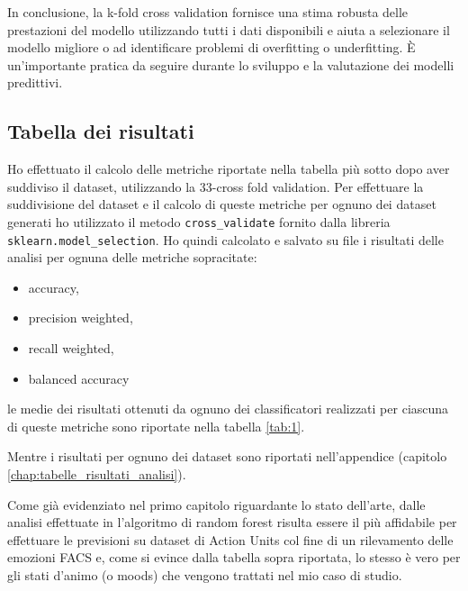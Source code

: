 In conclusione, la k-fold cross validation fornisce una stima robusta delle prestazioni del modello utilizzando tutti i dati disponibili e aiuta a selezionare il modello migliore o ad identificare problemi di overfitting o underfitting. È un'importante pratica da seguire durante lo sviluppo e la valutazione dei modelli predittivi.


\subsection{Tabella dei risultati}
Ho effettuato il calcolo delle metriche riportate nella tabella più sotto dopo aver suddiviso il dataset, utilizzando la 33-cross fold validation.
Per effettuare la suddivisione del dataset e il calcolo di queste metriche per ognuno dei dataset generati ho utilizzato il metodo \texttt{cross_validate} fornito dalla libreria \texttt{sklearn.model_selection}.
Ho quindi calcolato e salvato su file i risultati delle analisi per ognuna delle metriche sopracitate:
\begin{itemize}
    \item accuracy,
    \item precision weighted,
    \item recall weighted, 
    \item balanced accuracy
\end{itemize}
le medie dei risultati ottenuti da ognuno dei classificatori realizzati per ciascuna di queste metriche sono riportate nella tabella \ref{tab:1}.

Mentre i risultati per ognuno dei dataset sono riportati nell'appendice (capitolo \ref{chap:tabelle_risultati_analisi}).

Come già evidenziato nel primo capitolo riguardante lo stato dell’arte, dalle analisi effettuate in \cite{FaceExpreRecoImgSeqTwoFoldRandomForestClass} l’algoritmo di random forest risulta essere il più affidabile per effettuare le previsioni su dataset di Action Units col fine di un rilevamento delle emozioni FACS e, come si evince dalla tabella sopra riportata, lo stesso è vero per gli stati d’animo (o moods) che vengono trattati nel mio caso di studio.

